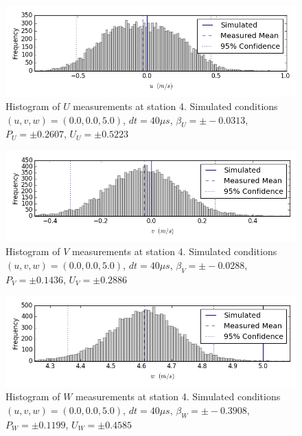 \begin{figure}[H]
\centering
\includegraphics[width=6in]{figs/Ely_May28th04001/uncertainty_Ely_May28th04001_U}
\caption{Histogram of $U$ measurements at station 4. Simulated conditions $(u,v,w)=(0.0, 0.0, 5.0)$, $dt=40 \mu s$, $\beta_U=\pm -0.0313$, $P_U=\pm 0.2607$, $U_U=\pm 0.5223$}
\label{fig:uncertainty_Ely_May28th04001_U}
\end{figure}


\begin{figure}[H]
\centering
\includegraphics[width=6in]{figs/Ely_May28th04001/uncertainty_Ely_May28th04001_V}
\caption{Histogram of $V$ measurements at station 4. Simulated conditions $(u,v,w)=(0.0, 0.0, 5.0)$, $dt=40 \mu s$, $\beta_V=\pm -0.0288$, $P_V=\pm 0.1436$, $U_V=\pm 0.2886$}
\label{fig:uncertainty_Ely_May28th04001_V}
\end{figure}


\begin{figure}[H]
\centering
\includegraphics[width=6in]{figs/Ely_May28th04001/uncertainty_Ely_May28th04001_W}
\caption{Histogram of $W$ measurements at station 4. Simulated conditions $(u,v,w)=(0.0, 0.0, 5.0)$, $dt=40 \mu s$, $\beta_W=\pm -0.3908$, $P_W=\pm 0.1199$, $U_W=\pm 0.4585$}
\label{fig:uncertainty_Ely_May28th04001_W}
\end{figure}


